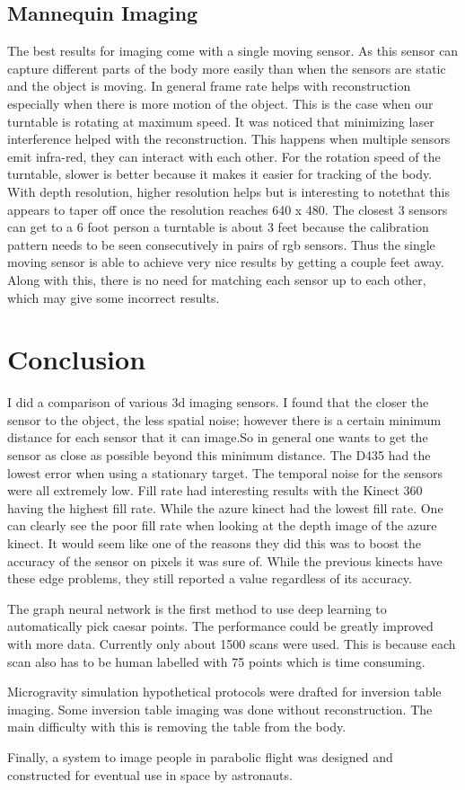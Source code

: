 \section{Mannequin Imaging}
The best results for imaging come with a single moving sensor. As this sensor can capture different parts of the body more easily than when the sensors are static and the object is moving. In general frame rate helps with reconstruction especially when there is more motion of the object. This is the case when our turntable is rotating at maximum speed. It was noticed that minimizing laser interference helped with the reconstruction. This happens when multiple sensors emit infra-red, they can interact with each other. For the rotation speed of the turntable, slower is better because it makes it easier for tracking of the body. With depth resolution, higher resolution helps but is interesting to notethat this appears to taper off once the resolution reaches 640 x 480. The closest 3 sensors can get to a 6 foot person a turntable is about 3 feet because the calibration pattern needs to be seen consecutively in pairs of rgb sensors. Thus the single moving sensor is able to achieve very nice results by getting a couple feet away. Along with this, there is no need for matching each sensor up to each other, which may give some incorrect results.


\chapter{Conclusion}

I did a comparison of various 3d imaging sensors. I found that the closer the sensor to the object, the less spatial noise; however there is a certain minimum distance for each sensor that it can image.So in general one wants to get the sensor as close as possible beyond this minimum distance. The D435 had the lowest error when using a stationary target. The temporal noise for the sensors were all extremely low. Fill rate had interesting results with the Kinect 360 having the highest fill rate. While the azure kinect had the lowest fill rate. One can clearly see the poor fill rate when looking at the depth image of the azure kinect. It would seem like one of the reasons they did this was to boost the accuracy of the sensor on pixels it was sure of. While the previous kinects have these edge problems, they still reported a value regardless of its accuracy.

The graph neural network is the first method to use deep learning to automatically pick caesar points. The performance could be greatly improved with more data. Currently only about 1500 scans were used. This is because each scan also has to be human labelled with 75 points which is time consuming.

Microgravity simulation hypothetical protocols were drafted for inversion table imaging. Some inversion table imaging was done without reconstruction. The main difficulty with this is removing the table from the body.

Finally, a system to image people in parabolic flight was designed and constructed for eventual use in space by astronauts.

